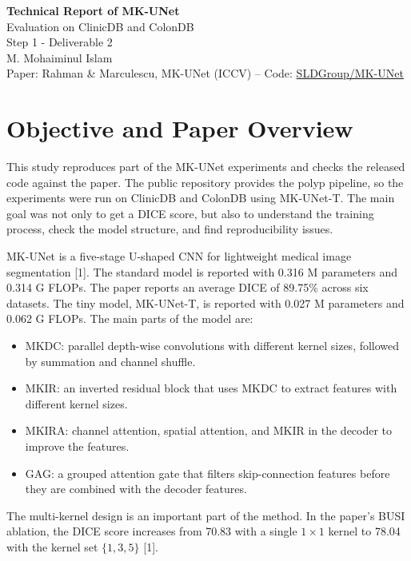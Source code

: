 \documentclass[10pt,a4paper]{article}
\begin{document}
\begin{center}
{\LARGE\bfseries Technical Report of MK-UNet}\\[3pt]
{\large Evaluation on ClinicDB and ColonDB}\\[4pt]
{\small Step 1 - Deliverable 2}\\[3pt]
{\normalsize M. Mohaiminul Islam}\\[3pt]
{\footnotesize Paper: Rahman \& Marculescu, MK-UNet (ICCV) \quad--\quad
Code: \href{https://github.com/SLDGroup/MK-UNet.git}{SLDGroup/MK-UNet}}
\end{center}
\vspace{0.25em}

\section{Objective and Paper Overview}

This study reproduces part of the MK-UNet experiments and checks the released code against the paper. The public repository provides the polyp pipeline, so the experiments were run on ClinicDB and ColonDB using MK-UNet-T. The main goal was not only to get a DICE score, but also to understand the training process, check the model structure, and find reproducibility issues.

MK-UNet is a five-stage U-shaped CNN for lightweight medical image segmentation [1]. The standard model is reported with 0.316 M parameters and 0.314 G FLOPs. The paper reports an average DICE of 89.75\% across six datasets. The tiny model, MK-UNet-T, is reported with 0.027 M parameters and 0.062 G FLOPs. The main parts of the model are:

\begin{itemize}
\item MKDC: parallel depth-wise convolutions with different kernel sizes, followed by summation and channel shuffle.
\item MKIR: an inverted residual block that uses MKDC to extract features with different kernel sizes.
\item MKIRA: channel attention, spatial attention, and MKIR in the decoder to improve the features.
\item GAG: a grouped attention gate that filters skip-connection features before they are combined with the decoder features.
\end{itemize}

The multi-kernel design is an important part of the method. In the paper's BUSI ablation, the DICE score increases from 70.83 with a single $1\times1$ kernel to 78.04 with the kernel set $\{1,3,5\}$ [1].
\end{document}
